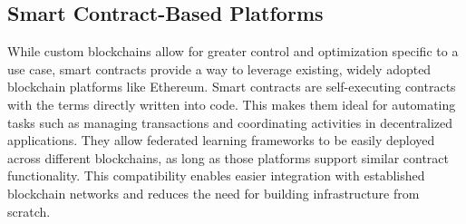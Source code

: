 \subsection{Smart Contract-Based Platforms}\label{sec:smart-contracts}
While custom blockchains allow for greater control and optimization specific to a use case, smart contracts
provide a way to leverage existing, widely adopted blockchain platforms like Ethereum. Smart contracts are
self-executing contracts with the terms directly written into code. This makes them ideal for automating
tasks such as managing transactions and coordinating activities in decentralized applications. They allow
federated learning frameworks to be easily deployed across different blockchains, as long as those platforms
support similar contract functionality. This compatibility enables easier integration with established
blockchain networks and reduces the need for building infrastructure from scratch.